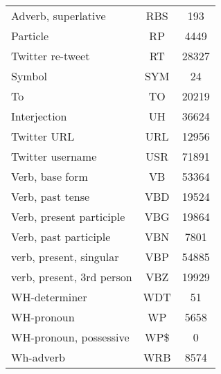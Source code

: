 \documentclass[conference,compsoc]{IEEEtran}
\begin{document}
\begin{center}
\begin{tabular}{|l|c|c|}
			Adverb, superlative & RBS & 193 \\
			Particle & RP & 4449 \\
			Twitter re-tweet & RT & 28327 \\
			Symbol & SYM & 24 \\
			To & TO & 20219 \\
			Interjection & UH & 36624 \\
			Twitter URL & URL & 12956 \\
			Twitter username & USR & 71891 \\
			Verb, base form & VB & 53364 \\
			Verb, past tense &VBD & 19524 \\
			Verb, present participle & VBG & 19864 \\
			Verb, past participle & VBN & 7801 \\
			verb, present, singular & VBP & 54885 \\
			verb, present, 3rd person & VBZ & 19929 \\
			WH-determiner & WDT & 51 \\
			WH-pronoun & WP & 5658 \\
			WH-pronoun, possessive & WP\$ & 0 \\
			Wh-adverb & WRB & 8574 \\
		\hline	
	\end{tabular} 
\end{center}
\bigskip
\bigskip
\end{document}
